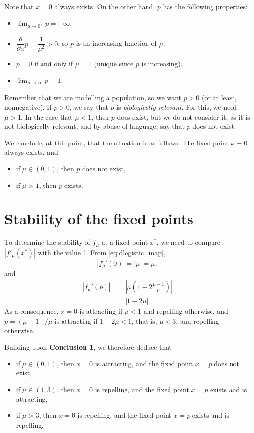 \documentclass[12pt]{article}
\theoremstyle{plain}
\begin{document}
Note that $x=0$ always exists. On the other hand, $p$ has the following properties:
\begin{itemize}
\item $\lim_{\mu\to 0^+}p=-\infty$.
\item $\dfrac{\partial}{\partial \mu}p=\dfrac{1}{\mu^2}>0$, so $p$ is an increasing function of $\mu$.
\item $p=0$ if and only if $\mu=1$ (unique since $p$ is increasing).
\item $\lim_{\mu\to\infty}p=1$.
\end{itemize}
Remember that we are modelling a population, so we want $p>0$ (or at least, nonnegative). If $p>0$, we say that $p$ is \emph{biologically relevant}. For this, we need $\mu>1$. In the case that $\mu<1$, then $p$ does exist, but we do not consider it, as it is not biologically relevant, and by abuse of language, say that $p$ does not exist.

\vskip0.5cm
 We conclude, at this point, that the situation is as follows. The fixed point $x=0$ always exists, and
\begin{itemize}
\item if $\mu\in(0,1)$, then $p$ does not exist,
\item if $\mu>1$, then $p$ exists.
\end{itemize}


\section{Stability of the fixed points}
To determine the stability of $f_\mu$ at a fixed point $x^*$, we need to compare $|f'_\mu(x^*)|$ with the value 1. From \eqref{eq:dlogistic_map},
\[
|f_\mu'(0)|=|\mu|=\mu,
\]
and
\begin{align*}
|f_\mu'(p)| &= \left|\mu\left(1-2\frac{\mu-1}{\mu}\right)\right| \\
&= |1-2\mu|.
\end{align*}
As a consequence, $x=0$ is attracting if $\mu<1$ and repelling otherwise, and $p=(\mu-1)/\mu$ is attracting if $1-2\mu<1$, that is, $\mu<3$, and repelling otherwise.

\vskip0.5cm
 Building upon {\bf Conclusion 1}, we therefore deduce that
\begin{itemize}
\item if $\mu\in(0,1)$, then $x=0$ is attracting, and the fixed point $x=p$ does not exist,
\item if $\mu\in(1,3)$, then $x=0$ is repelling, and the fixed point $x=p$ exists and is attracting,
\item if $\mu>3$, then $x=0$ is repelling, and the fixed point $x=p$ exists and is repelling.
\end{itemize}
\end{document}
